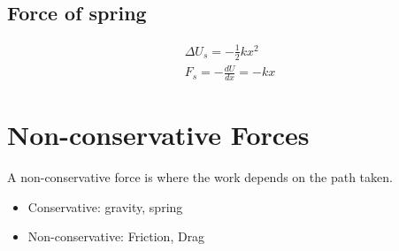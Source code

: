 \documentclass{article}
\theoremstyle{mytheoremstyle}
\theoremstyle{mytheoremstyle}
\theoremstyle{myproblemstyle}
\begin{document}
    \subsection*{Force of spring}
    \begin{align*}
        \Delta U_s  = -\frac{1}{2} kx^2 \\
        F_s = -\frac{dU}{dx}
        = -kx
    \end{align*}

    \section*{Non-conservative Forces}
    A non-conservative force is where the work depends on the path taken.
    \begin{itemize}
        \item Conservative: gravity, spring
        \item Non-conservative: Friction, Drag
    \end{itemize}
\end{document}
